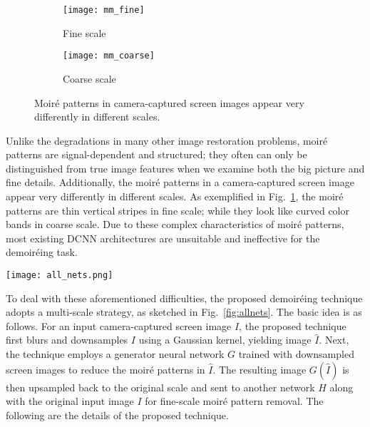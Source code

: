 \documentclass[10pt,twocolumn,letterpaper]{article}
\begin{document}
\begin{figure}
  \centering
  \begin{subfigure}[t]{0.45\linewidth}
    \centering
    \texttt{[image: mm\_fine]}
    \caption{Fine scale}
  \end{subfigure}
  \begin{subfigure}[t]{0.45\linewidth}
    \centering
    \texttt{[image: mm\_coarse]}
    \caption{Coarse scale}
  \end{subfigure}
  \caption{Moir\'e patterns in camera-captured screen images appear
    very differently in different scales.}
  \label{fig:moire}
\end{figure}

Unlike the degradations in many other image restoration problems,
moir\'e patterns are signal-dependent and structured; they often can
only be distinguished from true image features when we examine both
the big picture and fine details.  Additionally, the moir\'e patterns
in a camera-captured screen image appear very differently in different
scales.  As exemplified in Fig.~\ref{fig:moire}, the moir\'e patterns
are thin vertical stripes in fine scale; while they look like curved
color bands in coarse scale.  Due to these complex characteristics of
moir\'e patterns, most existing DCNN architectures are unsuitable and
ineffective for the demoir\'eing task.

\begin{figure*}
  \centering
  \texttt{[image: all\_nets.png]}
  \caption{The architecture of the proposed neural network.  The
    kernel size $k$ and the number of feature maps $f$ are marked
    above each convolutional layer.}
  \label{fig:allnets}
\end{figure*}

To deal with these aforementioned difficulties, the proposed
demoir\'eing technique adopts a multi-scale strategy, as sketched in
Fig.~\ref{fig:allnets}.  The basic idea is as follows.  For an input
camera-captured screen image $I$, the proposed technique first blurs
and downsamples $I$ using a Gaussian kernel, yielding image $\hat{I}$.
Next, the technique employs a generator neural network $G$ trained
with downsampled screen images to reduce the moir\'e patterns in
$\hat{I}$.  The resulting image $G(\hat{I})$ is then upsampled back to
the original scale and sent to another network $H$ along with the
original input image $I$ for fine-scale moir\'e pattern removal.  The
following are the details of the proposed technique.
\end{document}
